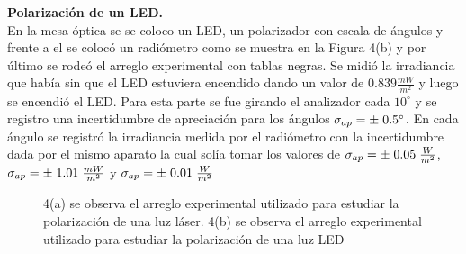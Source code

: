 \documentclass[DIV=calc, paper=a4, fontsize=10pt]{scrartcl}
\begin{document}
\textcolor{carmine}{\textbf{Polarización de un LED.}}\\
En la mesa óptica se se coloco un LED, un polarizador con escala de ángulos y frente a el se colocó un radiómetro como se muestra en la Figura 4(b) y por último se rodeó el arreglo experimental con tablas negras. Se midió la irradiancia que había sin que el LED estuviera encendido dando un valor de $0.839\frac{mW}{m^2}$ y luego se encendió el LED. Para esta parte se fue girando el analizador cada $10^{\circ}$ y se registro una incertidumbre de apreciación para los ángulos $\sigma_{ap}=\pm\hspace{0.1cm}0.5^{\circ}$. En cada ángulo se registró la irradiancia medida por el radiómetro con la incertidumbre dada por el mismo aparato la cual solía tomar los valores de  $\sigma_{ap}=\pm\hspace{0.1cm}0.05\hspace{0.1cm}\frac{W}{m^{2}}$, $\sigma_{ap}=\pm\hspace{0.1cm}1.01\hspace{0.1cm}\frac{mW}{m^{2}}$ y  
$\sigma_{ap}=\pm\hspace{0.1cm}0.01\hspace{0.1cm}\frac{W}{m^{2}}$
\begin{figure}[H]
 \centering
 \caption{4(a) se observa el arreglo experimental utilizado para estudiar la polarización de una luz láser. 4(b) se observa el arreglo experimental utilizado para estudiar la polarización de una luz LED}
 \label{f:animales}
\end{figure}
\end{document}
